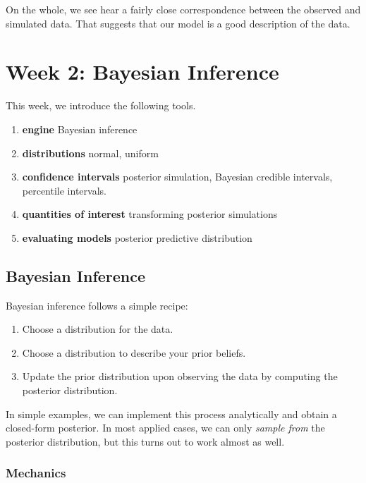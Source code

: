\documentclass[
]{book}
\providecommand{\tightlist}{%
  \setlength{\itemsep}{0pt}\setlength{\parskip}{0pt}}
\begin{document}
On the whole, we see hear a fairly close correspondence between the observed and simulated data. That suggests that our model is a good description of the data.

\hypertarget{week-2-bayesian-inference}{%
\chapter{Week 2: Bayesian Inference}\label{week-2-bayesian-inference}}

This week, we introduce the following tools.

\begin{enumerate}
\def\labelenumi{\arabic{enumi}.}
\tightlist
\item
  \textbf{engine} Bayesian inference
\item
  \textbf{distributions} normal, uniform
\item
  \textbf{confidence intervals} posterior simulation, Bayesian credible intervals, percentile intervals.
\item
  \textbf{quantities of interest} transforming posterior simulations
\item
  \textbf{evaluating models} posterior predictive distribution
\end{enumerate}

\hypertarget{bayesian-inference}{%
\section{Bayesian Inference}\label{bayesian-inference}}

Bayesian inference follows a simple recipe:

\begin{enumerate}
\def\labelenumi{\arabic{enumi}.}
\tightlist
\item
  Choose a distribution for the data.
\item
  Choose a distribution to describe your prior beliefs.
\item
  Update the prior distribution upon observing the data by computing the posterior distribution.
\end{enumerate}

In simple examples, we can implement this process analytically and obtain a closed-form posterior. In most applied cases, we can only \emph{sample from} the posterior distribution, but this turns out to work almost as well.

\hypertarget{mechanics}{%
\subsection{Mechanics}\label{mechanics}}
\end{document}
